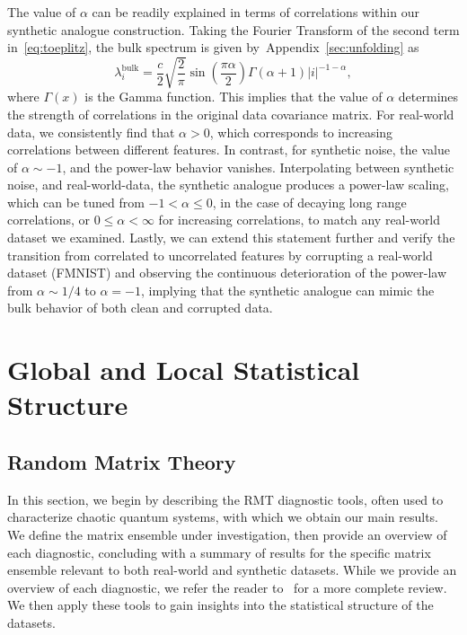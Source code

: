\documentclass{article}
\begin{document}
The value of $\alpha$ can be readily explained in terms of correlations within our synthetic analogue construction. Taking the Fourier Transform of the second term in~\cref{eq:toeplitz}, the bulk spectrum is given by~Appendix~\ref{sec:unfolding} as
\begin{equation}
    \lambda_i^\mathrm{bulk} = \frac{c}{2} \sqrt{\frac{2}{\pi }}  
    \sin{\left( \frac{\pi \alpha}{2} \right) }
    \Gamma (\alpha +1) \left| i\right| ^{-1-\alpha},
\end{equation}
where $\Gamma(x)$ is the Gamma function. 
%
This implies that the value of $\alpha$ determines the strength of correlations in the original data covariance matrix.
For real-world data, we consistently find that $\alpha>0$, which corresponds to increasing correlations between different features.
In contrast, for synthetic noise, the value of $\alpha \sim -1$, and the power-law behavior vanishes. Interpolating between synthetic noise, and real-world-data, the synthetic analogue produces a power-law scaling, which can be tuned from $-1 < \alpha \leq 0$, in the case of decaying long range correlations, or $0 \leq \alpha < \infty$ for increasing correlations, to match any real-world dataset we examined. Lastly, we can extend this statement further and verify the transition from correlated to uncorrelated features by corrupting a real-world dataset (FMNIST) and observing the continuous deterioration of the power-law from $\alpha \sim 1/4$ to $\alpha = -1$, implying that the synthetic analogue can mimic the bulk behavior of both clean and corrupted data.




\section{Global and Local Statistical Structure}

\subsection{Random Matrix Theory}
\label{theory}



In this section, we begin by describing the RMT diagnostic tools, often used to characterize chaotic quantum systems, with which we obtain our main results. We define the matrix ensemble under investigation, then provide an overview of each diagnostic, concluding with a summary of results for the specific matrix ensemble relevant to both real-world and synthetic datasets.
While we provide an overview of each diagnostic, we refer the reader to~\citet{tao2012topics, Kim_2023} for a more complete review. We then apply these tools to gain insights into the statistical structure of the datasets.
\end{document}
